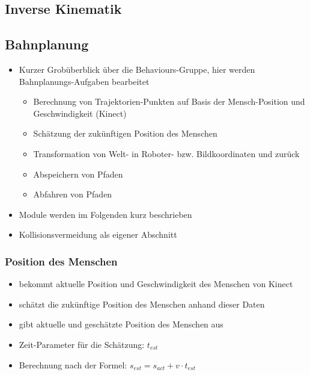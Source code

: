 


\subsection{Inverse Kinematik}
\label{inverse_kinematik_subsec}
\authorsection{\editorjulian}



\subsection{Bahnplanung}
\label{bahnplanung_subsec}
\authorsection{\editortobias}


\begin{itemize}
	\item Kurzer Grobüberblick über die Behaviours-Gruppe, hier werden Bahnplanungs-Aufgaben bearbeitet
	\begin{itemize}
		\item Berechnung von Trajektorien-Punkten auf Basis der Mensch-Position und Geschwindigkeit (Kinect)
		\item Schätzung der zukünftigen Position des Menschen
		\item Transformation von Welt- in Roboter- bzw. Bildkoordinaten und zurück
		\item Abspeichern von Pfaden
		\item Abfahren von Pfaden
	\end{itemize}
	\item Module werden im Folgenden kurz beschrieben
	\item Kollisionsvermeidung als eigener Abschnitt
\end{itemize}



\subsubsection{Position des Menschen}

\begin{itemize}
    \item bekommt aktuelle Position und Geschwindigkeit des Menschen von Kinect
    \item schätzt die zukünftige Position des Menschen anhand dieser Daten
    \item gibt aktuelle und geschätzte Position des Menschen aus
    \item Zeit-Parameter für die Schätzung: $t_{est}$
    \item Berechnung nach der Formel: $s_{est} = s_{act} + v \cdot t_{est}$
\end{itemize}


